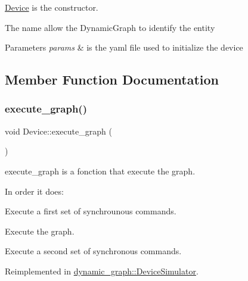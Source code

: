 \hyperlink{classdynamic__graph_1_1Device}{Device} is the constructor. 

The name allow the Dynamic\+Graph to identify the entity 
\begin{DoxyParams}{Parameters}
{\em params} & is the yaml file used to initialize the device \\
\hline
\end{DoxyParams}


\subsection{Member Function Documentation}
\mbox{\label{classdynamic__graph_1_1Device_adb596e7acd67089bb4929cf577b3c6ff}} 
\subsubsection{\texorpdfstring{execute\+\_\+graph()}{execute\_graph()}}
{\footnotesize\ttfamily void Device\+::execute\+\_\+graph (\begin{DoxyParamCaption}{ }\end{DoxyParamCaption})\hspace{0.3cm}{\ttfamily [virtual]}}



execute\+\_\+graph is a fonction that execute the graph. 

In order it does\+:
\begin{DoxyItemize}
\item Execute a first set of synchrounous commands.
\item Execute the graph.
\item Execute a second set of synchronous commands. 
\end{DoxyItemize}

Reimplemented in \hyperlink{classdynamic__graph_1_1DeviceSimulator_a614c51ee8d55765019ae98715f875ed5}{dynamic\+\_\+graph\+::\+Device\+Simulator}.

\mbox{\label{classdynamic__graph_1_1Device_a126268314fea8fff802fc957cbf3e0d7}} 
